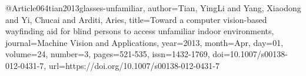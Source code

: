 @Article{064tian2013glasses-unfamiliar,
author={Tian, YingLi and Yang, Xiaodong and Yi, Chucai and Arditi, Aries},
title={Toward a computer vision-based wayfinding aid for blind persons to access unfamiliar indoor environments},
journal={Machine Vision and Applications},
year={2013},
month={Apr},
day={01},
volume={24},
number={3},
pages={521-535},
issn={1432-1769},
doi={10.1007/s00138-012-0431-7},
url={https://doi.org/10.1007/s00138-012-0431-7}
}